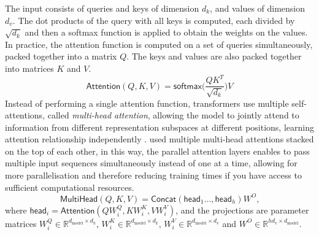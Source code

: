 \documentclass{article}
\begin{document}
	The input consists of queries and keys of dimension $d_k$, and values of dimension $d_v$. The dot 
	products of the query with all keys is computed, each divided by $\sqrt{d_k}$ and then a 
	softmax function is applied to obtain the weights on the values.
	In practice, the attention function is computed on a set of queries simultaneously, packed together 
	into a matrix $Q$. The keys and values are also packed together into matrices $K$ and $V$. 
	\begin{equation}
		\label{eqn:attention}
		\mathsf{Attention}(Q, K, V) = \mathsf{softmax} \big( \frac{QK^T}{\sqrt{d_k}}\big)V
	\end{equation}
	Instead of performing a single attention function, transformers use multiple self-attentions, called 
	\textit{multi-head attention}, allowing the model to jointly attend to information from different 
	representation subspaces at different positions, learning attention relationship independently	
	\cite{vaswani2017attention}.
	\citet{vaswani2017attention} used multiple multi-head attentions stacked on the top of each other, 
	in this way, the parallel attention layers enables to pass multiple input sequences simultaneously 
	instead of one at a time, allowing for more parallelisation and therefore reducing training times if you 
	have access to sufficient computational resources.
	\begin{equation}
		\label{eqn:multihead}
		{\mathsf{MultiHead}(Q, K, V) = \mathsf{Concat}(\mathsf{head}_1 \dots, 
			\mathsf{head}_h) W^O }
		\mbox{,}
	\end{equation}
	where $ \mathsf{head}_i = \mathsf{Attention}(QW_i^Q, KW_i^K , VW_i^V)$, and the 
	projections are parameter matrices $W_i^Q \in \mathbb{R}^{d_{\text{model}}\times 
		d_k}$, %
	$W_i^K \in \mathbb{R}^{d_{\text{model}}\times d_k}$, $W_i^V \in 
	\mathbb{R}^{d_{\text{model}}\times d_v}$ and $W^O \in \mathbb{R}^{hd_v \times 
		d_{\text{model}}}$.
	
\end{document}

